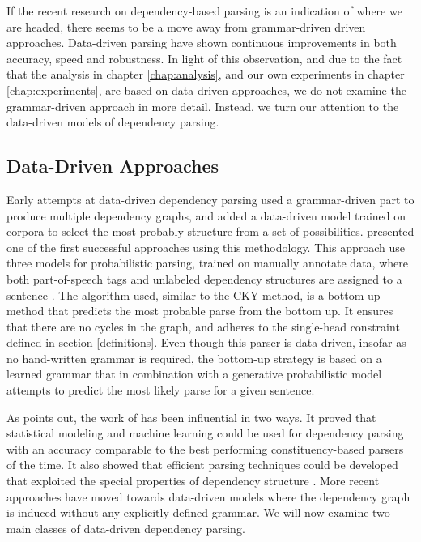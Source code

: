 If the recent research on dependency-based parsing is an indication of where we are headed, there seems to be a move away from grammar-driven driven approaches. Data-driven parsing have shown continuous improvements in both accuracy, speed and robustness. In light of this observation, and due to the fact that the analysis in chapter \ref{chap:analysis}, and our own experiments in chapter \ref{chap:experiments}, are based on data-driven approaches, we do not examine the grammar-driven approach in more detail. Instead, we turn our attention to the data-driven models of dependency parsing.

\subsection{Data-Driven Approaches}
\label{data-driven}

Early attempts at data-driven dependency parsing used a grammar-driven part to produce multiple dependency graphs, and added a data-driven model trained on corpora to select the most probably structure from a set of possibilities. \citeauthor{Eisner:96b} presented one of the first successful approaches using this methodology. This approach use three models for probabilistic parsing, trained on manually annotate data, where both part-of-speech tags and unlabeled dependency structures are assigned to a sentence \cite{Eisner:96b}. The algorithm used, similar to the CKY method, is a bottom-up method that predicts the most probable parse from the bottom up. It ensures that there are no cycles in the graph, and adheres to the single-head constraint defined in section \ref{definitions}. Even though this parser is  data-driven, insofar as no hand-written grammar is required, the bottom-up strategy is based on a learned grammar that in combination with a generative probabilistic model attempts to predict the most likely parse for a given sentence.

As \citeauthor{Niv:05} points out, the work of \citeauthor{Eisner:96b} has been influential in two ways. It proved that statistical modeling and machine learning could be used for dependency parsing with an accuracy comparable to the best performing constituency-based parsers of the time. It also showed that efficient parsing techniques could be developed that exploited the special properties of dependency structure \cite{Niv:05}. More recent approaches have moved towards data-driven models where the dependency graph is induced without any explicitly defined grammar. We will now examine two main classes of data-driven dependency parsing.

